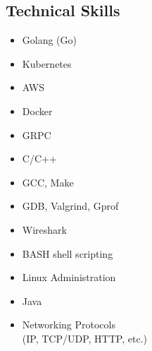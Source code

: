 \documentclass{res}
\begin{document}
\begin{resume}
\section{Technical Skills}
\vspace{-1pt}
\begin{multicols*}{3}
\begin{itemize}\addtolength{\itemsep}{-0.5\baselineskip}
								\item Golang (Go)
								\item Kubernetes
								\item AWS
								\item Docker
								\item GRPC
								\item C/C++
								\item GCC, Make
								\item GDB, Valgrind, Gprof
								\item Wireshark
								\item BASH shell scripting
								\item Linux Administration
								\item Java
								\item Networking Protocols \\(IP, TCP/UDP, HTTP, etc.)
\end{itemize}
\end{multicols*}
\end{resume}
\end{document}
